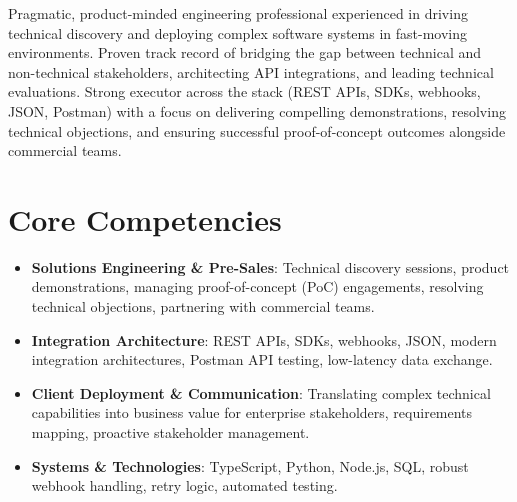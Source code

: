 \documentclass[10pt,a4paper,sans]{moderncv}
\begin{document}
\makecvtitle
\vspace{-12pt}

\small{Pragmatic, product-minded engineering professional experienced in driving technical discovery and deploying complex software systems in fast-moving environments. Proven track record of bridging the gap between technical and non-technical stakeholders, architecting API integrations, and leading technical evaluations. Strong executor across the stack (REST APIs, SDKs, webhooks, JSON, Postman) with a focus on delivering compelling demonstrations, resolving technical objections, and ensuring successful proof-of-concept outcomes alongside commercial teams.}
\vspace{2pt}

\section{Core Competencies}
\vspace{1pt}
\begin{itemize}
\item \textbf{Solutions Engineering \& Pre-Sales}: Technical discovery sessions, product demonstrations, managing proof-of-concept (PoC) engagements, resolving technical objections, partnering with commercial teams.
\item \textbf{Integration Architecture}: REST APIs, SDKs, webhooks, JSON, modern integration architectures, Postman API testing, low-latency data exchange.
\item \textbf{Client Deployment \& Communication}: Translating complex technical capabilities into business value for enterprise stakeholders, requirements mapping, proactive stakeholder management.
\item \textbf{Systems \& Technologies}: TypeScript, Python, Node.js, SQL, robust webhook handling, retry logic, automated testing.
\end{itemize}
\vspace{3pt}

\end{document}

